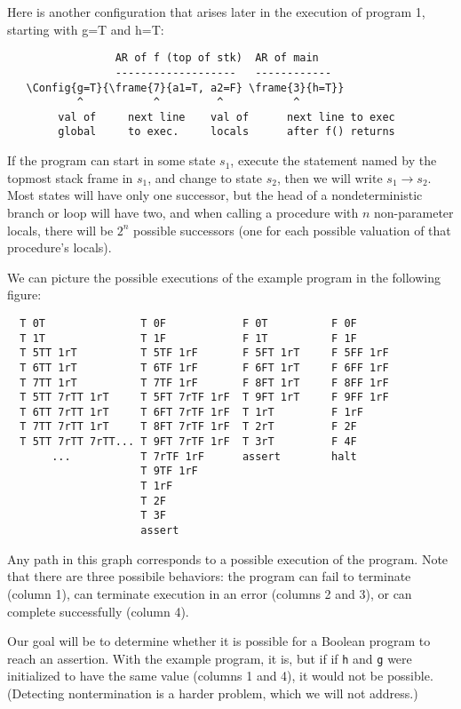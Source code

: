 \documentclass{article}
\newcommand{\Code}[1]{\texttt{#1}}
\newcommand{\Config}[2]{\ensuremath{\langle #1, #2 \rangle}}
\begin{document}
Here is another configuration that arises later in the execution of
program 1, starting with g=T and h=T:

\begin{verbatim}
                 AR of f (top of stk)  AR of main
                 -------------------   ------------
   \Config{g=T}{\frame{7}{a1=T, a2=F} \frame{3}{h=T}}
           ^           ^         ^           ^
        val of     next line    val of      next line to exec
        global     to exec.     locals      after f() returns
\end{verbatim}


If the program can start in some state $s_1$, execute the statement
named by the topmost stack frame in $s_1$, and change to state $s_2$,
then we will write $s_1 \rightarrow s_2$. Most states will have only
one successor, but the head of a nondeterministic branch or loop will
have two, and when calling a procedure with $n$ non-parameter locals,
there will be $2^n$ possible successors (one for each possible
valuation of that procedure's locals).

We can picture the possible executions of the example program in the
following figure:

\begin{verbatim}
  T 0T               T 0F            F 0T          F 0F
  T 1T               T 1F            F 1T          F 1F
  T 5TT 1rT          T 5TF 1rF       F 5FT 1rT     F 5FF 1rF
  T 6TT 1rT          T 6TF 1rF       F 6FT 1rT     F 6FF 1rF
  T 7TT 1rT          T 7TF 1rF       F 8FT 1rT     F 8FF 1rF
  T 5TT 7rTT 1rT     T 5FT 7rTF 1rF  T 9FT 1rT     F 9FF 1rF
  T 6TT 7rTT 1rT     T 6FT 7rTF 1rF  T 1rT         F 1rF
  T 7TT 7rTT 1rT     T 8FT 7rTF 1rF  T 2rT         F 2F
  T 5TT 7rTT 7rTT... T 9FT 7rTF 1rF  T 3rT         F 4F
       ...           T 7rTF 1rF      assert        halt
                     T 9TF 1rF
                     T 1rF
                     T 2F
                     T 3F
                     assert
\end{verbatim}



Any path in this graph corresponds to a possible execution of the
program. Note that there are three possibile behaviors: the program
can fail to terminate (column 1), can terminate execution in an error
(columns 2 and 3), or can complete successfully (column 4).

Our goal will be to determine whether it is possible for a Boolean
program to reach an assertion. With the example program, it is, but if
if \Code{h} and \Code{g} were initialized to have the same value
(columns 1 and 4), it would not be possible. (Detecting nontermination
is a harder problem, which we will not address.)
\end{document}
